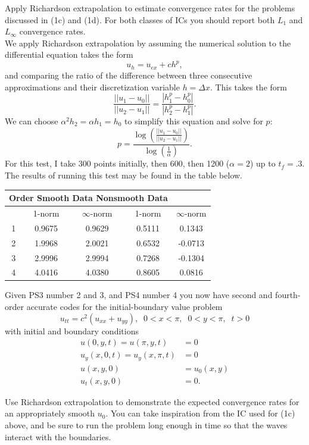 \item Apply Richardson extrapolation to estimate convergence rates for the problems discussed in (1c) and (1d). For both classes of ICs you should report both $L_1$ and $L_\infty$ convergence rates.\\

We apply Richardson extrapolation by assuming the numerical solution to the differential equation takes the form 
$$u_h=u_{ex}+ch^p,$$
and comparing the ratio of the difference between three consecutive approximations and their discretization variable $h=\Delta x.$ This takes the form
$$\frac{||u_1-u_0||}{||u_2-u_1||}=\frac{|h_1^p-h_0^p|}{|h_2^p-h_1^p|}.$$
We can choose $\alpha^2 h_2=\alpha h_1=h_0$ to simplify this equation and solve for $p$:
$$p=\frac{\log\left(\frac{||u_1-u_0||}{||u_2-u_1||}\right)}{\log\left(\frac{1}{\alpha}\right)}.$$ 
For this test, I take 300 points initially, then 600, then 1200 ($\alpha=2$) up to $t_f=.3$.
The results of running this test may be found in the table below.
\begin{table}[h]
\centering
\begin{tabular}{c|c|c|c|c}
\hline
\multicolumn{4}{c}{Order  \hspace{.5cm}  Smooth Data \hspace{.5cm}     Nonsmooth Data}\\
\hline
&1-norm&$\infty$-norm&1-norm&$\infty$-norm\\
1&0.9675&0.9629&0.5111&0.1343\\
2&1.9968&2.0021&0.6532&-0.0713\\
3&2.9996&2.9994&0.7268&-0.1304\\
4&4.0416&4.0380&0.8605&0.0816\\
\hline
\end{tabular}
\end{table}

\eenum
\vspace{1.1in}
\item Given PS3 number 2 and 3, and PS4 number 4 you now have second and fourth-order accurate codes for the initial-boundary value problem
$$ u_{tt}=c^2(u_{xx}+u_{yy}),\;\; 0<x<\pi,\;\;0<y<\pi,\;\; t>0$$
with initial and boundary conditions
\begin{align*}
u(0,y,t)=u(\pi,y,t)&=0\\
u_y(x,0,t)=u_y(x,\pi,t)&=0\\
u(x,y,0)&=u_0(x,y)\\
u_t(x,y,0)&=0.
\end{align*}
\benum
\item Use Richardson extrapolation to demonstrate the expected convergence rates for an appropriately smooth $u_0$. You can take inspiration from the IC used for (1c) above, and be sure to run the problem long enough in time so that the waves interact with the boundaries.\\

